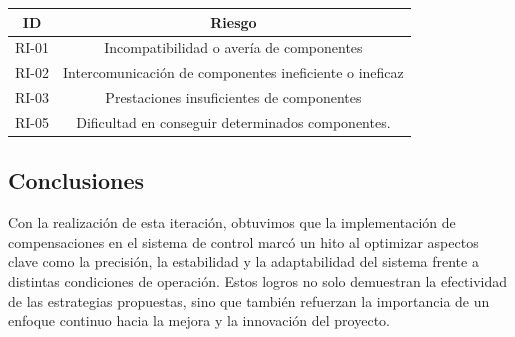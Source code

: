 \begin{center} \begin{tabular}{|c|c|}
    \hline \rowcolor{test_header_color}
        ID & Riesgo \\
    \hline
        RI-01 & Incompatibilidad o avería de componentes \\
    \hline
        RI-02 & Intercomunicación de componentes ineficiente o ineficaz \\
    \hline
        RI-03 & Prestaciones insuficientes de componentes \\
    \hline
        RI-05 & Dificultad en conseguir determinados componentes. \\
    \hline
\end{tabular} \end{center}

\subsection{Conclusiones}

Con la realización de esta iteración, obtuvimos que la implementación de compensaciones en el sistema de control marcó un hito al optimizar aspectos clave como la precisión, la estabilidad y la adaptabilidad del sistema frente a distintas condiciones de operación. Estos logros no solo demuestran la efectividad de las estrategias propuestas, sino que también refuerzan la importancia de un enfoque continuo hacia la mejora y la innovación del proyecto.
